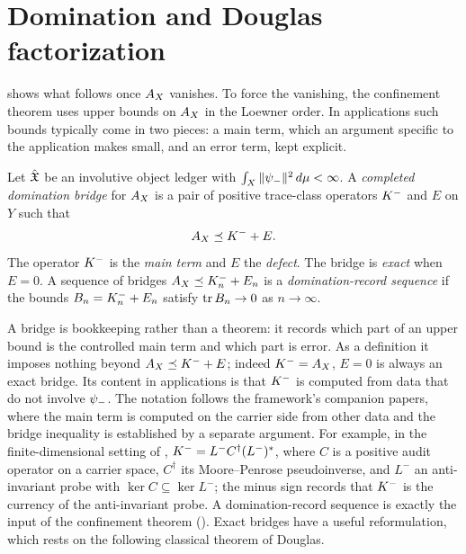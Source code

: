 \section{Domination and Douglas factorization}
\label{sec:domination}

 shows what follows once \(A_{X}\) vanishes.
To force the vanishing, the confinement theorem uses upper bounds on
\(A_{X}\) in the Loewner order.  In applications such bounds typically
come in two pieces: a main term, which an argument specific to the
application makes small, and an error term, kept explicit.

\begin{definition}
\label{def:duality_confinement:completed-domination-bridge}
Let \(\hat{\mathfrak{X}}\) be an involutive object ledger with
\(\int_X\|\psi_{-}\|^2\,d\mu<\infty\).  A \emph{completed domination
bridge} for \(A_{X}\) is a pair of positive trace-class operators
\(K^{-}\) and \(E\) on \(Y\) such that
\[
  A_{X}\preceq K^{-}+E.
\]
The operator \(K^{-}\) is the \emph{main term} and \(E\) the
\emph{defect}.  The bridge is \emph{exact} when \(E=0\).  A sequence of
bridges \(A_{X}\preceq K^{-}_n+E_n\) is a \emph{domination-record
sequence} if the bounds \(B_n=K^{-}_n+E_n\) satisfy
\(\operatorname{tr} B_n\to0\) as \(n\to\infty\).
\end{definition}

A bridge is bookkeeping rather than a theorem: it records which part of
an upper bound is the controlled main term and which part is error.
As a definition it imposes nothing beyond \(A_{X}\preceq K^{-}+E\);
indeed \(K^{-}=A_{X}\), \(E=0\) is always an exact bridge.  Its content
in applications is that \(K^{-}\) is computed from data that do not
involve \(\psi_{-}\).
The notation follows the framework's companion papers, where the main
term is computed on the carrier side from other data and the bridge
inequality is established by a separate argument.  For example, in the
finite-dimensional setting of \citep{TsiokosNeedleKiller2026},
\(K^{-}=L^-C^\dagger(L^-)^*\), where \(C\) is a positive audit
operator on a carrier space, \(C^\dagger\) its Moore--Penrose
pseudoinverse, and \(L^-\) an anti-invariant probe with
\(\ker C\subseteq\ker L^-\); the minus sign records that \(K^{-}\) is
the currency of the anti-invariant probe.  A
domination-record sequence is exactly the input of the confinement
theorem ().  Exact
bridges have a useful reformulation, which rests on the following
classical theorem of Douglas.


